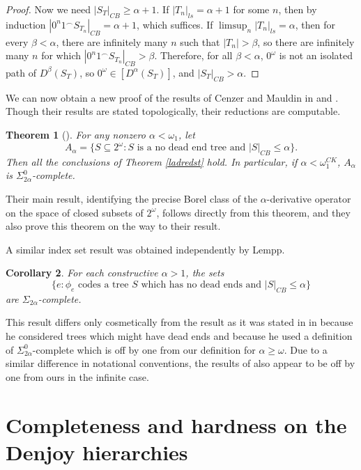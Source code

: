 \documentclass[12pt]{amsart}
\newtheorem{theorem}{Theorem}
\newtheorem{cor}[theorem]{Corollary}
\begin{document}
\begin{proof}
Now we need $|S_T|_{CB} \geq \alpha + 1$. If $|T_n|_{ls} = \alpha + 1$ for some $n$, then by induction $|0^n1^\smallfrown S_{T_n}|_{CB}=\alpha+1$, which suffices.
If $\limsup_n |T_n|_{ls} = \alpha$, then for every $\beta < \alpha$, there are infinitely many $n$ such that $|T_n| > \beta$, so there are infinitely many $n$ for which $|0^n1^\smallfrown S_{T_n}|_{CB} > \beta$.  Therefore, for all $\beta<\alpha$, $0^\omega$ is not an isolated
path of $D^\beta(S_T)$, so $0^\omega \in [D^\alpha(S_T)]$, and $|S_T|_{CB} > \alpha$.
 \end{proof}

{We can now obtain a new proof of the results 
of Cenzer and Mauldin in \cite{CenzerMauldin1983} and 
\cite{CenzerMauldin1982}.  Though their results are stated 
topologically, their reductions are computable.}

\begin{theorem}[{\cite[Theorem 8]{CenzerMauldin1983}}]
For any nonzero $\alpha<\omega_1$, let 
$$A_\alpha = \{S \subseteq 2^\omega : S \text{ is a no dead end tree and }
|S|_{CB}\leq\alpha\}.$$  Then all the conclusions of Theorem \ref{ladredst} 
hold.  In particular, if $\alpha<\omega_1^{CK}$, 
$A_\alpha$ is $\Sigma^0_{2\alpha}$-complete.
\end{theorem}

{Their main result, identifying the precise Borel class of the 
$\alpha$-derivative operator 
on the space of closed subsets of $2^\omega$, follows 
directly from this theorem, 
and they also prove this theorem on the way to their result. 

A similar index set result was obtained independently by Lempp.}

 \begin{cor}{\cite{Lempp}}
 For each constructive $\alpha > 1$, the sets $$\{ e : \phi_e \text{ codes a tree $S$ which has no dead ends and } |S|_{CB}\leq \alpha\}$$  are 
$\Sigma_{2\alpha}$-complete.
 \end{cor}

This result differs only cosmetically from the result as it was stated in
in \cite{Lempp} because 
he considered trees which might have dead ends and because he used 
a definition of $\Sigma^0_{2\alpha}$-complete which is off by one from 
our definition for $\alpha \geq \omega$.  
Due to a similar difference in notational conventions, the results of 
\cite{CenzerMauldin1983} also appear to be off by one from ours in 
the infinite case.


\section{Completeness and hardness on the Denjoy hierarchies}\label{sec:completeness}
\end{document}
